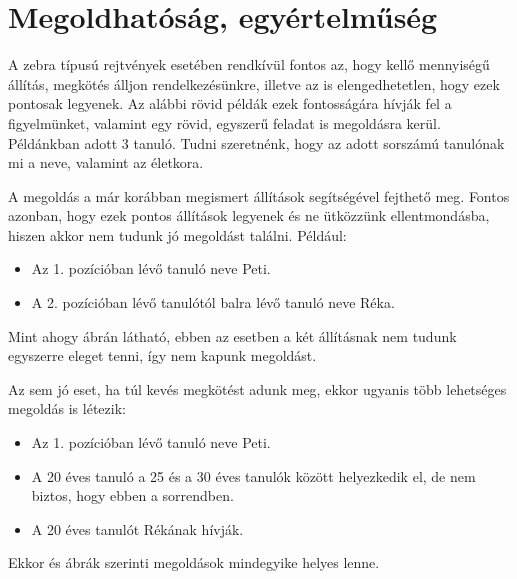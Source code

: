 \documentclass[12pt,a4paper,oneside]{report}
\begin{document}

    \section{Megoldhatóság, egyértelműség} %

A zebra típusú rejtvények esetében rendkívül fontos az, hogy kellő mennyiségű állítás, megkötés álljon rendelkezésünkre, illetve az is elengedhetetlen, hogy ezek pontosak legyenek. Az alábbi rövid példák ezek fontosságára hívják fel a figyelmünket, valamint egy rövid, egyszerű feladat is megoldásra kerül.
Példánkban adott 3 tanuló. Tudni szeretnénk, hogy az adott sorszámú tanulónak mi a neve, valamint az életkora.

A megoldás a már korábban megismert állítások segítségével fejthető meg. Fontos azonban, hogy ezek pontos állítások legyenek és ne ütközzünk ellentmondásba, hiszen akkor nem tudunk jó megoldást találni. Például:
\begin{itemize}
\item Az 1. pozícióban lévő tanuló neve Peti.
\item A 2. pozícióban lévő tanulótól balra lévő tanuló neve Réka.
\end{itemize}

Mint ahogy  ábrán látható, ebben az esetben a két állításnak nem tudunk egyszerre eleget tenni, így nem kapunk megoldást.


Az sem jó eset, ha túl kevés megkötést adunk meg, ekkor ugyanis több lehetséges megoldás is létezik:
\begin{itemize}
\item Az 1. pozícióban lévő tanuló neve Peti.
\item A 20 éves tanuló a 25 és a 30 éves tanulók között helyezkedik el, de nem biztos, hogy ebben a sorrendben.
\item A 20 éves tanulót Rékának hívják.
\end{itemize}

Ekkor   és  ábrák szerinti megoldások mindegyike helyes lenne.

\end{document}

